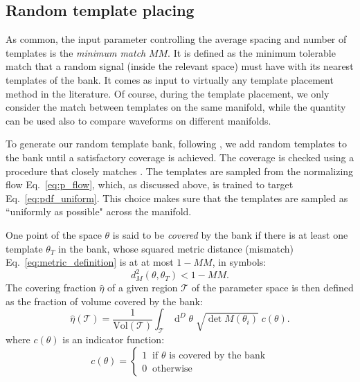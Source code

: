 \documentclass[twocolumn,showpacs,preprintnumbers,nofootinbib,prd,
superscriptaddress,10pt]{revtex4-2}
\newcommand{\dvol}[2]{\ensuremath{\operatorname{d}^{#2}\!{#1}}}
\begin{document}
\subsection{Random template placing} \label{sec:template_placing}

As common, the input parameter controlling the average spacing and number of templates is the {\it minimum match} $MM$. It is defined as the minimum tolerable match that a random signal (inside the relevant space) must have with its nearest templates of the bank. It comes as input to virtually any template placement method in the literature.
Of course, during the template placement, we only consider the match between templates on the same manifold, while the quantity can be used also to compare waveforms on different manifolds.

To generate our random template bank, following \cite{Messenger:2008ta}, we add random templates to the bank until a satisfactory coverage is achieved. The coverage is checked using a procedure that closely matches \cite{Coogan:2022qxs}.
The templates are sampled from the normalizing flow Eq.~\eqref{eq:p_flow}, which, as discussed above, is trained to target Eq.~\eqref{eq:pdf_uniform}. This choice makes sure that the templates are sampled as ``uniformly as possible" across the manifold.

One point of the space $\theta$ is said to be {\it covered} by the bank if there is at least one template $\theta_T$ in the bank, whose squared metric distance (mismatch) Eq.~\eqref{eq:metric_definition} is at at most $1 - MM$, in symbols:
\begin{equation}
	d^2_M(\theta, \theta_T)<1 - MM.
\end{equation}
%
The covering fraction $\hat{\eta}$ of a given region $\mathcal{T}$ of the parameter space is then defined as the fraction of volume covered by the bank:
\begin{equation}\label{eq:coverage}
	\hat{\eta}(\mathcal{T}) = \frac{1}{\text{Vol}(\mathcal{T})} \int_\mathcal{T} \dvol{\theta}{D} \; \sqrt{\det M(\theta_i)} \; c(\theta).
\end{equation}
where $c(\theta)$ is an indicator function:
\begin{equation}
	c(\theta) = \left\{
                \begin{array}{ll}
                  1 \;\; \text{if $\theta$ is covered by the bank}\\
                  0 \;\; \text{otherwise}
                \end{array}
              \right.
\end{equation}
\end{document}
